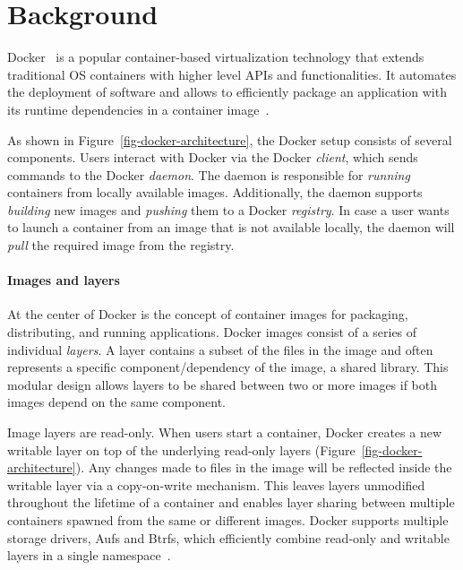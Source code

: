 \section{Background}
\label{sec:background}


Docker~\cite{docker} is a popular container-based virtualization technology
that extends traditional OS containers with higher level APIs and
functionalities.
%
It automates the deployment of software and allows to efficiently package an
application with its runtime dependencies in a container image~\cite{slacker}.



As shown in Figure~\ref{fig-docker-architecture}, the Docker setup consists of
several components.
%
Users interact with Docker via the Docker \emph{client}, which sends commands
to the Docker \emph{daemon}.
%
The daemon is responsible for \emph{running} containers from locally available
images.
%
Additionally, the daemon supports \emph{building} new images and \emph{pushing}
them to a Docker \emph{registry}.
%
In case a user wants to launch a container from an image that is not available
locally, the daemon will \emph{pull} the required image from the registry.

\paragraph{Images and layers}
%
At the center of Docker is the concept of container images for packaging,
distributing, and running applications.
%
Docker images consist of a series of individual \emph{layers}.
%
A layer contains a subset of the files in the image and often represents a
specific component/dependency of the image, \eg a shared library.
%
This modular design allows layers to be shared between two or more images if
both images depend on the same component.

Image layers are read-only.
%
When users start a container, Docker creates a new
writable layer on top of the underlying read-only layers
(Figure~\ref{fig-docker-architecture}).
%
Any changes made to files in the image will be reflected inside the writable
layer via a copy-on-write mechanism.
%
This leaves layers unmodified throughout the lifetime of a container and
enables layer sharing between multiple containers spawned from the same or
different images.
%
Docker supports multiple storage drivers, \eg Aufs and Btrfs, which efficiently
combine read-only and writable layers in a single
namespace~\cite{docker-driver-eval}.
%

